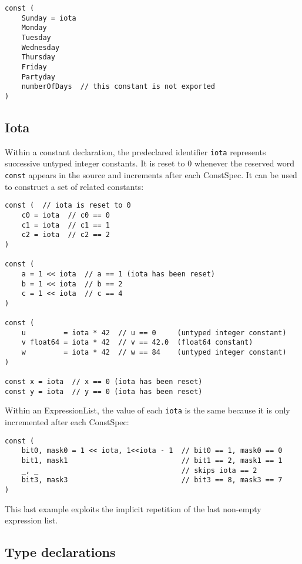 \begin{Verbatim}[frame=single]
const (
    Sunday = iota
    Monday
    Tuesday
    Wednesday
    Thursday
    Friday
    Partyday
    numberOfDays  // this constant is not exported
)
\end{Verbatim}

\subsection*{Iota}

Within a constant declaration, the
predeclared identifier \texttt{iota} represents successive untyped
integer constants. It is reset to 0 whenever the
reserved word \texttt{const} appears in the source and increments after
each ConstSpec. It can be used to construct a set
of related constants:

\begin{Verbatim}[frame=single]
const (  // iota is reset to 0
    c0 = iota  // c0 == 0
    c1 = iota  // c1 == 1
    c2 = iota  // c2 == 2
)

const (
    a = 1 << iota  // a == 1 (iota has been reset)
    b = 1 << iota  // b == 2
    c = 1 << iota  // c == 4
)

const (
    u         = iota * 42  // u == 0     (untyped integer constant)
    v float64 = iota * 42  // v == 42.0  (float64 constant)
    w         = iota * 42  // w == 84    (untyped integer constant)
)

const x = iota  // x == 0 (iota has been reset)
const y = iota  // y == 0 (iota has been reset)
\end{Verbatim}

Within an ExpressionList, the value of each \texttt{iota} is the same
because it is only incremented after each ConstSpec:

\begin{Verbatim}[frame=single]
const (
    bit0, mask0 = 1 << iota, 1<<iota - 1  // bit0 == 1, mask0 == 0
    bit1, mask1                           // bit1 == 2, mask1 == 1
    _, _                                  // skips iota == 2
    bit3, mask3                           // bit3 == 8, mask3 == 7
)
\end{Verbatim}

This last example exploits the implicit repetition of the last non-empty
expression list.

\subsection*{Type declarations}

